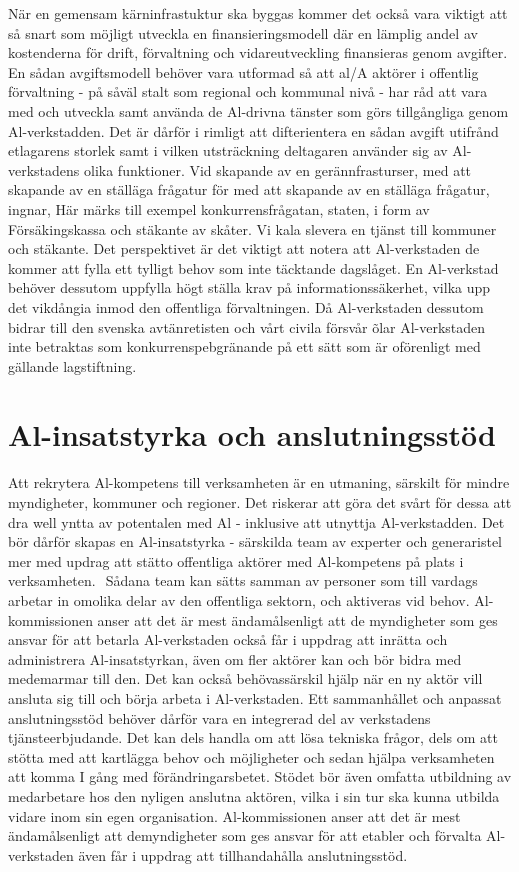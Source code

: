 {{{{{{{{{{{{{{{När en gemensam kärninfrastuktur ska byggas kommer det också vara viktigt att så snart som möjligt utveckla en finansieringsmodell där en lämplig andel av kostenderna för drift, förvaltning och vidareutveckling finansieras genom avgifter. En sådan avgiftsmodell behöver vara utformad så att al/A aktörer i offentlig förvaltning - på såväl stalt som regional och kommunal nivå - har råd att vara med och utveckla samt använda de Al-drivna tänster som görs tillgångliga genom Al-verkstadden. Det är dårför i rimligt att difterientera en sådan avgift utifrånd etlagarens storlek samt i vilken utsträckning deltagaren använder sig av Al-verkstadens olika funktioner.
Vid skapande av en gerännfrasturser, med att skapande av en ställäga frågatur för med att skapande av en ställäga frågatur, ingnar, Här märks till exempel konkurrensfrågatan, staten, i form av Försäkingskassa och stäkante av skåter. Vi kala slevera en tjänst till kommuner och stäkante. Det perspektivet är det viktigt att notera att Al-verkstaden de kommer att fylla ett tylligt behov som inte täcktande dagslåget. En Al-verkstad behöver dessutom uppfylla högt ställa krav på informationssäkerhet, vilka upp det vikdångia inmod den offentliga förvaltningen. Då Al-verkstaden dessutom bidrar till den svenska avtänretisten och vårt civila försvår õlar Al-verkstaden inte betraktas som konkurrenspebgränande på ett sätt som är oförenligt med gällande lagstiftning.
\section*{Al-insatstyrka och anslutningsstöd}
Att rekrytera Al-kompetens till verksamheten är en utmaning, särskilt för mindre myndigheter, kommuner och regioner. Det riskerar att göra det svårt för dessa att dra well yntta av potentalen med Al - inklusive att utnyttja Al-verkstadden. Det bör dårför skapas en Al-insatstyrka - särskilda team av experter och generaristel mer med updrag att stätto offentliga aktörer med Al-kompetens på plats i verksamheten. \({ }^{}\) Sådana team kan sätts samman av personer som till vardags arbetar in omolika delar av den offentliga sektorn, och aktiveras vid behov. Al-kommissionen anser att det är mest ändamålsenligt att de myndigheter som ges ansvar för att betarla Al-verkstaden också får i uppdrag att inrätta och administrera Al-insatstyrkan, även om fler aktörer kan och bör bidra med medemarmar till den.
Det kan också behövassärskil hjälp när en ny aktör vill ansluta sig till och börja arbeta i Al-verkstaden. Ett sammanhållet och anpassat anslutningsstöd behöver dårför vara en integrerad del av verkstadens tjänsteerbjudande. Det kan dels handla om att lösa tekniska frågor, dels om att stötta med att kartlägga behov och möjligheter och sedan hjälpa verksamheten att komma I gång med förändringarsbetet.
Stödet bör även omfatta utbildning av medarbetare hos den nyligen anslutna aktören, vilka i sin tur ska kunna utbilda vidare inom sin egen organisation. Al-kommissionen anser att det är mest ändamålsenligt att demyndigheter som ges ansvar för att etabler och förvalta Al-verkstaden även får i uppdrag att tillhandahålla anslutningsstöd.
}}}}}}}}}}}}}}}
